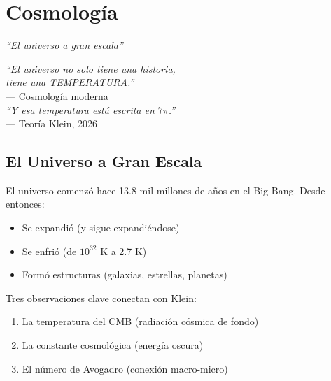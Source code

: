 \chapter{Cosmología}
\label{cap:cosmologia}

\begin{center}
\textit{``El universo a gran escala''}
\end{center}

\vspace{0.5cm}

\begin{tcolorbox}[colback=white, colframe=kleinblue, boxrule=2pt]
\centering
\textit{``El universo no solo tiene una historia,\\
tiene una TEMPERATURA.''}\\
--- Cosmología moderna\\[0.3cm]
\textit{``Y esa temperatura está escrita en $7\pi$.''}\\
--- Teoría Klein, 2026
\end{tcolorbox}


\section{El Universo a Gran Escala}

El universo comenzó hace 13.8 mil millones de años en el Big Bang.
Desde entonces:
\begin{itemize}
    \item Se expandió (y sigue expandiéndose)
    \item Se enfrió (de $10^{32}$ K a 2.7 K)
    \item Formó estructuras (galaxias, estrellas, planetas)
\end{itemize}

Tres observaciones clave conectan con Klein:
\begin{enumerate}
    \item La temperatura del CMB (radiación cósmica de fondo)
    \item La constante cosmológica (energía oscura)
    \item El número de Avogadro (conexión macro-micro)
\end{enumerate}



